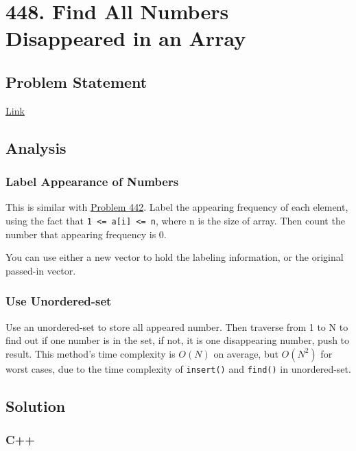 \documentclass[11pt]{article}
\begin{document}
\section{448. Find All Numbers Disappeared in an Array}
\label{sec:org18636e4}
\subsection{Problem Statement}
\label{sec:org9546765}
\href{https://leetcode.com/problems/find-all-numbers-disappeared-in-an-array/}{Link}
\subsection{Analysis}
\label{sec:org5a41611}
\subsubsection{Label Appearance of Numbers}
\label{sec:org4329837}
This is similar with \hyperref[org4c4ef04]{Problem 442}. Label the appearing frequency of each element, using the fact that \texttt{1 <= a[i] <= n}, where n is the size of array. Then count the number that appearing frequency is 0.

You can use either a new vector to hold the labeling information, or the original passed-in vector.

\subsubsection{Use Unordered-set}
\label{sec:org1b9d9d9}
Use an unordered-set to store all appeared number. Then traverse from 1 to N to find out if one number is in the set, if not, it is one disappearing number, push to result. This method's time complexity is \(O(N)\) on average, but \(O(N^2)\) for worst cases, due to the time complexity of \texttt{insert()} and \texttt{find()} in unordered-set.

\subsection{Solution}
\label{sec:orge0ab1cd}
\subsubsection{C++}
\label{sec:org8feeef2}
\end{document}
